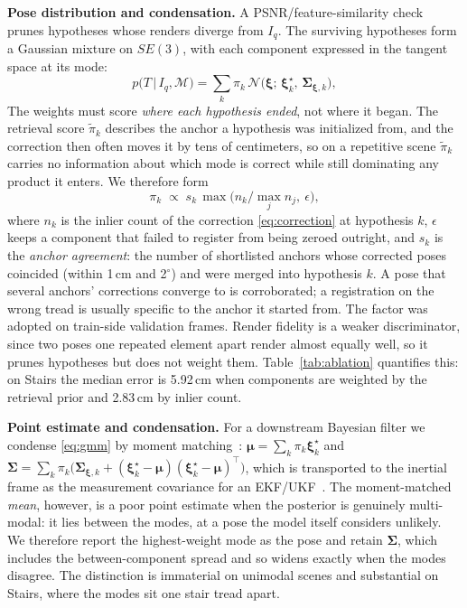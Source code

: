 \documentclass[journal]{IEEEtran}
\begin{document}
\textbf{Pose distribution and condensation.} A PSNR/feature-similarity check~\cite{sgloc} prunes hypotheses whose renders diverge from $I_q$. The surviving hypotheses form a Gaussian mixture on $SE(3)$, with each component expressed in the tangent space at its mode:
\begin{equation}
p\big(T\,|\,I_q,\mathcal{M}\big)=\sum_{k}\pi_k\,
\mathcal{N}\!\big(\bm\xi;\,\bm\xi_k^\star,\,\bm\Sigma_{\bm\xi,k}\big),
\label{eq:gmm}
\end{equation}
The weights must score \emph{where each hypothesis ended}, not where it began. The retrieval score $\tilde\pi_k$ describes the anchor a hypothesis was initialized from, and the correction then often moves it by tens of centimeters, so on a repetitive scene $\tilde\pi_k$ carries no information about which mode is correct while still dominating any product it enters. We therefore form
\begin{equation}
\pi_k \;\propto\; s_k\,\max\!\big(n_k/\textstyle\max_j n_j,\ \epsilon\big),
\label{eq:weights}
\end{equation}
where $n_k$ is the inlier count of the correction \eqref{eq:correction} at hypothesis $k$, $\epsilon$ keeps a component that failed to register from being zeroed outright, and $s_k$ is the \emph{anchor agreement}: the number of shortlisted anchors whose corrected poses coincided (within 1\,cm and 2$^\circ$) and were merged into hypothesis $k$. A pose that several anchors' corrections converge to is corroborated; a registration on the wrong tread is usually specific to the anchor it started from. The factor was adopted on train-side validation frames. Render fidelity is a weaker discriminator, since two poses one repeated element apart render almost equally well, so it prunes hypotheses but does not weight them. Table~\ref{tab:ablation} quantifies this: on Stairs the median error is 5.92\,cm when components are weighted by the retrieval prior and 2.83\,cm by inlier count.

\textbf{Point estimate and condensation.} For a downstream Bayesian filter we condense \eqref{eq:gmm} by moment matching~\cite{ksenet}: $\bm\mu=\sum_k\pi_k\bm\xi_k^\star$ and $\bm\Sigma=\sum_k\pi_k\big(\bm\Sigma_{\bm\xi,k}+(\bm\xi_k^\star-\bm\mu)(\bm\xi_k^\star-\bm\mu)^\top\big)$, which is transported to the inertial frame as the measurement covariance for an EKF/UKF~\cite{ukf}. The moment-matched \emph{mean}, however, is a poor point estimate when the posterior is genuinely multi-modal: it lies between the modes, at a pose the model itself considers unlikely. We therefore report the highest-weight mode as the pose and retain $\bm\Sigma$, which includes the between-component spread and so widens exactly when the modes disagree. The distinction is immaterial on unimodal scenes and substantial on Stairs, where the modes sit one stair tread apart.
\end{document}

